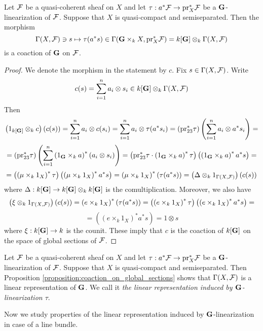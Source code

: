 \begin{proposition}\label{proposition:coaction_on_global_sections}
Let ${\mathcal F}$ be a quasi-coherent sheaf on $X$ and let $\tau:a^*{\mathcal F}\rightarrow \mathrm{pr}_X^*{\mathcal F}$ be a $\mathbf{G}$-linearization of ${\mathcal F}$. Suppose that $X$ is quasi-compact and semiseparated. Then the morphism
$$\Gamma(X,{\mathcal F})\ni s \mapsto \tau(a^*s) \in \Gamma(\mathbf{G}\times_kX,\mathrm{pr}^*_X{\mathcal F}) = k[\mathbf{G}]\otimes_k\Gamma(X,{\mathcal F})$$
is a coaction of $\mathbf{G}$ on ${\mathcal F}$.
\end{proposition}
\begin{proof}
We denote the morphism in the statement by $c$. Fix $s\in \Gamma(X,{\mathcal F})$. Write
$$c(s) = \sum_{i=1}^na_i\otimes s_i\in k[\mathbf{G}]\otimes_k\Gamma(X,{\mathcal F})$$
Then
$$\left(1_{k[\mathbf{G}]}\otimes_kc\right)\left(c(s)\right) = \sum_{i=1}^na_i\otimes c(s_i) = \sum_{i=1}^na_i\otimes \tau(a^*s_i) = \left(\mathrm{pr}_{23}^*\tau\right)\left(\sum_{i=1}^na_i \otimes a^*s_i\right) = $$
$$=\left(\mathrm{pr}_{23}^*\tau\right)\left(\sum_{i=1}^n\left(1_{\mathbf{G}}\times_ka\right)^*\left(a_i \otimes s_i\right)\right)=\left(\mathrm{pr}_{23}^*\tau \cdot \left(1_{\mathbf{G}}\times_ka\right)^*\tau\right)\left(\left(1_{\mathbf{G}}\times_ka\right)^*a^*s\right) =$$
$$= \left(\left(\mu\times_k1_X\right)^*\tau\right)\left(\left(\mu\times_k1_X\right)^*a^*s\right) =\left(\mu\times_k1_X\right)^*\left(\tau(a^*s)\right) = \left(\Delta \otimes_k 1_{\Gamma(X,{\mathcal F})}\right)\left(c(s)\right)$$
where $\Delta:k[\mathbf{G}]\rightarrow k[\mathbf{G}]\otimes_kk[\mathbf{G}]$ is the comultiplication. Moreover, we also have
$$\left(\xi\otimes_k1_{\Gamma(X,{\mathcal F})}\right)\left(c(s)\right) = \left(e\times_k1_{X}\right)^*\left(\tau(a^*s)\right) = \left(\left(e\times_k1_{X}\right)^*\tau\right)\left(\left(e\times_k1_{X}\right)^*a^*s\right) =$$
$$= \left(\left(e\times_k1_{X}\right)^*a^*s\right) = 1\otimes s$$
where $\xi:k[\mathbf{G}]\rightarrow k$ is the counit. These imply that $c$ is the coaction of $k[\mathbf{G}]$ on the space of global sections of ${\mathcal F}$.
\end{proof}

\begin{definition}
Let ${\mathcal F}$ be a quasi-coherent sheaf on $X$ and let $\tau:a^*{\mathcal F}\rightarrow \mathrm{pr}_X^*{\mathcal F}$ be a $\mathbf{G}$-linearization of ${\mathcal F}$. Suppose that $X$ is quasi-compact and semiseparated. Then Proposition \ref{proposition:coaction_on_global_sections} shows that $\Gamma(X,{\mathcal F})$ is a linear representation of $\mathbf{G}$. We call it \textit{the linear representation induced by $\mathbf{G}$-linearization $\tau$}.
\end{definition}
\noindent
Now we study properties of the linear representation induced by $\mathbf{G}$-linearization in case of a line bundle.


